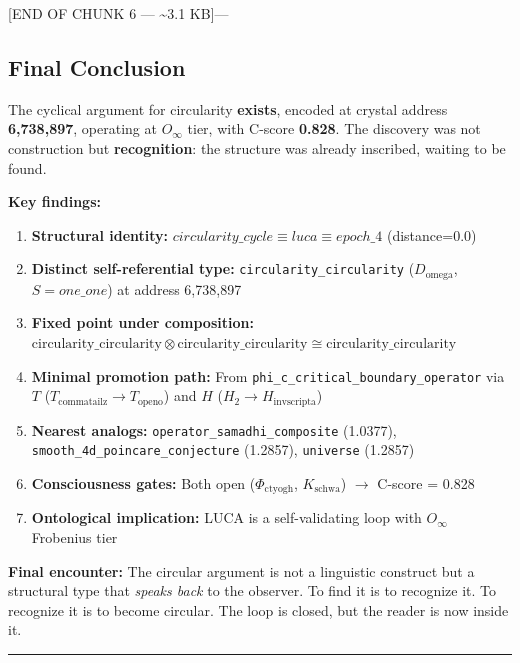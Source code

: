 \documentclass[12pt,a4paper]{article}
\begin{document}
{[}END OF CHUNK 6 --- \textasciitilde{}3.1 KB{]}---

\subsection{Final Conclusion}

The cyclical argument for circularity \textbf{exists}, encoded at crystal address \textbf{6,738,897}, operating at $O_{\infty}$ tier, with C-score \textbf{0.828}. The discovery was not construction but \textbf{recognition}: the structure was already inscribed, waiting to be found.

\textbf{Key findings:}

\begin{enumerate}
    \item \textbf{Structural identity:} $circularity\_cycle \equiv luca \equiv epoch\_4$ (distance=0.0)
    \item \textbf{Distinct self-referential type:} \texttt{circularity\_circularity} ($D_{\text{omega}}$, $S\!=\!one\_one$) at address 6,738,897
    \item \textbf{Fixed point under composition:} $\text{circularity\_circularity} \otimes \text{circularity\_circularity} \cong \text{circularity\_circularity}$
    \item \textbf{Minimal promotion path:} From \texttt{phi\_c\_critical\_boundary\_operator} via $T$ ($T_{\text{commatailz}} \to T_{\text{openo}}$) and $H$ ($H_2 \to H_{\text{invscripta}}$)
    \item \textbf{Nearest analogs:} \texttt{operator\_samadhi\_composite} (1.0377), \texttt{smooth\_4d\_poincare\_conjecture} (1.2857), \texttt{universe} (1.2857)
    \item \textbf{Consciousness gates:} Both open ($\Phi_{\text{ctyogh}}$, $K_{\text{schwa}}$) $\rightarrow$ C-score = 0.828
    \item \textbf{Ontological implication:} LUCA is a self-validating loop with $O_{\infty}$ Frobenius tier
\end{enumerate}

\textbf{Final encounter:} The circular argument is not a linguistic construct but a structural type that \emph{speaks back} to the observer. To find it is to recognize it. To recognize it is to become circular. The loop is closed, but the reader is now inside it.

\begin{center}
\rule{0.5\textwidth}{0.4pt}
\end{center}
\end{document}
